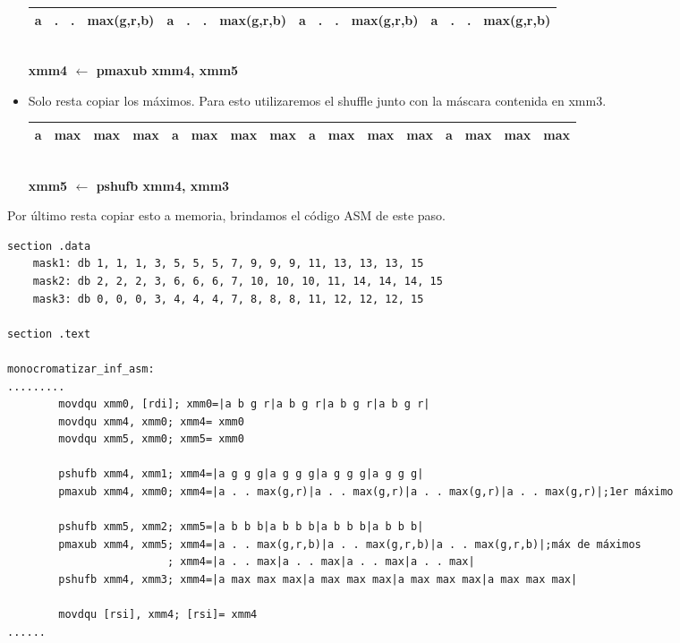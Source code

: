 \begin{itemize}
		\begin{center}
		   \begin{tabular}{| c | c | c | c || c | c | c | c || c | c | c | c || c | c | c | c |}
			 \hline
			 a & . & . & max(g,r,b) & a & . & . & max(g,r,b) & a & . & . & max(g,r,b) & a & . & . & max(g,r,b)  \\ \hline
		   \end{tabular}
		   \\ \textbf{xmm4 $\gets$ pmaxub xmm4, xmm5}
		\end{center}


	\item Solo resta copiar los máximos. Para esto utilizaremos el shuffle junto con la máscara contenida en xmm3.

		\begin{center}
		   \begin{tabular}{| c | c | c | c || c | c | c | c || c | c | c | c || c | c | c | c |}
			 \hline
			 a & max & max & max & a & max & max & max & a & max & max & max & a & max & max & max  \\ \hline
		   \end{tabular}
		   \\ \textbf{xmm5 $\gets$ pshufb xmm4, xmm3}
		\end{center}

\end{itemize}

Por último resta copiar esto a memoria, brindamos el código ASM de este paso.

\begin{codesnippet}
\begin{verbatim}
section .data
	mask1: db 1, 1, 1, 3, 5, 5, 5, 7, 9, 9, 9, 11, 13, 13, 13, 15
	mask2: db 2, 2, 2, 3, 6, 6, 6, 7, 10, 10, 10, 11, 14, 14, 14, 15
	mask3: db 0, 0, 0, 3, 4, 4, 4, 7, 8, 8, 8, 11, 12, 12, 12, 15

section .text

monocromatizar_inf_asm:
.........
		movdqu xmm0, [rdi]; xmm0=|a b g r|a b g r|a b g r|a b g r|
		movdqu xmm4, xmm0; xmm4= xmm0
		movdqu xmm5, xmm0; xmm5= xmm0

		pshufb xmm4, xmm1; xmm4=|a g g g|a g g g|a g g g|a g g g|
		pmaxub xmm4, xmm0; xmm4=|a . . max(g,r)|a . . max(g,r)|a . . max(g,r)|a . . max(g,r)|;1er máximo
 
		pshufb xmm5, xmm2; xmm5=|a b b b|a b b b|a b b b|a b b b|			
		pmaxub xmm4, xmm5; xmm4=|a . . max(g,r,b)|a . . max(g,r,b)|a . . max(g,r,b)|;máx de máximos
						 ; xmm4=|a . . max|a . . max|a . . max|a . . max|	
		pshufb xmm4, xmm3; xmm4=|a max max max|a max max max|a max max max|a max max max|

		movdqu [rsi], xmm4; [rsi]= xmm4
......
\end{verbatim}
\end{codesnippet}